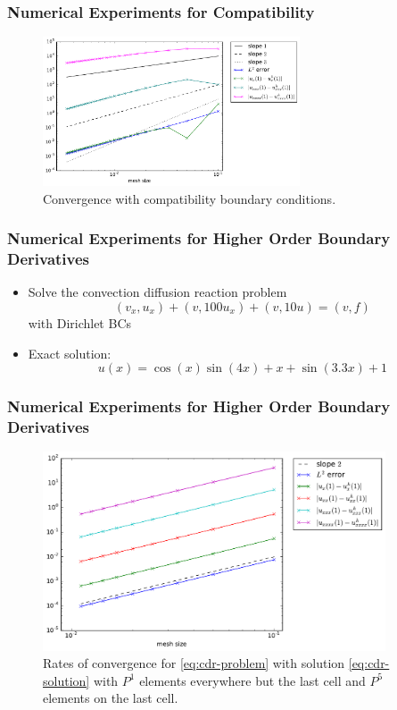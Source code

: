 \documentclass[8pt]{beamer}
\begin{document}
\begin{frame}
    \frametitle{Numerical Experiments for Compatibility}
    \begin{figure}
        \centering
        \includegraphics[width=3in]{bdf4_mid_september_compatibility.pdf}

        \caption{Convergence with compatibility boundary conditions.}
    \end{figure}
\end{frame}

\begin{frame}
    \frametitle{Numerical Experiments for Higher Order Boundary Derivatives}
    \begin{itemize}
        \item Solve the convection diffusion reaction problem
              \begin{equation}
                  (v_x, u_x) + (v, 100 u_x) + (v, 10 u) = (v, f)
                  \label{eq:cdr-problem}
              \end{equation}
              with Dirichlet BCs
        \item Exact solution:
              \begin{equation}
                  u(x) = \cos(x) \sin(4 x) + x + \sin(3.3 x) + 1
                  \label{eq:cdr-solution}
              \end{equation}
    \end{itemize}
\end{frame}

\begin{frame}
    \frametitle{Numerical Experiments for Higher Order Boundary Derivatives}

    \begin{figure}
        \centering

        \includegraphics[width=4in]{lagrange_1_5.pdf}

        \caption{Rates of convergence for \eqref{eq:cdr-problem} with solution
        \eqref{eq:cdr-solution} with \(P^1\) elements everywhere but the last
        cell and \(P^5\) elements on the last cell.}
    \end{figure}
\end{frame}
\end{document}
